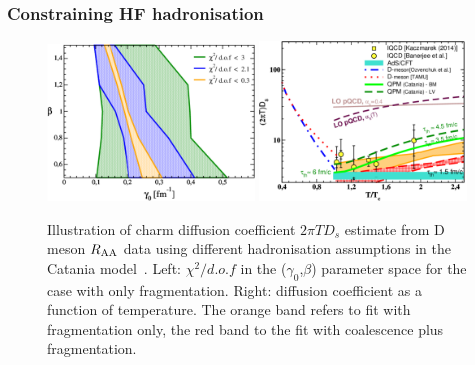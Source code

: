 


\subsubsection{Constraining HF hadronisation}
\label{sec:HFhadro3}


\begin{figure}[!hb]
\begin{center}
\includegraphics[width=0.49\textwidth]{hf/figures/chi2_vers2.pdf}
\includegraphics[width=0.49\textwidth]{hf/figures/Ds_lQCD_CHI2_COAL-FRAGM.pdf}
\end{center}
\caption{Illustration of charm diffusion coefficient $2\pi T D_s$ estimate from D meson $R_{\rm AA}$ data using different hadronisation assumptions in the Catania model~\cite{Das:2015ana,Das:2013kea}. Left: $\chi^2/d.o.f$ in the ($\gamma_0$,$\beta$)  parameter space for the case with only fragmentation.
Right: diffusion coefficient as a function of temperature. The orange band refers to fit 
with fragmentation only, the red band to the fit with coalescence plus fragmentation.}
\label{Fig:CHI2}
\end{figure}


